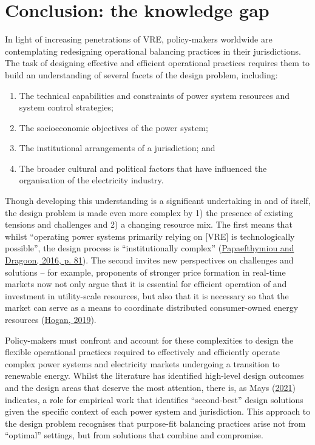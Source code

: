 \documentclass[12pt,a4paper,]{report}
\providecommand{\tightlist}{%
  \setlength{\itemsep}{0pt}\setlength{\parskip}{0pt}}
\begin{document}
\hypertarget{sec:lit_review-gap}{%
\section{Conclusion: the knowledge gap}\label{sec:lit_review-gap}}

In light of increasing penetrations of VRE, policy-makers worldwide are
contemplating redesigning operational balancing practices in their
jurisdictions. The task of designing effective and efficient operational
practices requires them to build an understanding of several facets of
the design problem, including:

\begin{enumerate}
\def\labelenumi{\arabic{enumi}.}
\tightlist
\item
  The technical capabilities and constraints of power system resources
  and system control strategies;
\item
  The socioeconomic objectives of the power system;
\item
  The institutional arrangements of a jurisdiction; and
\item
  The broader cultural and political factors that have influenced the
  organisation of the electricity industry.
\end{enumerate}

Though developing this understanding is a significant undertaking in and
of itself, the design problem is made even more complex by 1) the
presence of existing tensions and challenges and 2) a changing resource
mix. The first means that whilst ``operating power systems primarily
relying on {[}VRE{]} is technologically possible'', the design process
is ``institutionally complex''
(\protect\hyperlink{ref-papaefthymiou100RenewableEnergy2016}{Papaefthymiou
and Dragoon, 2016, p. 81}). The second invites new perspectives on
challenges and solutions -- for example, proponents of stronger price
formation in real-time markets now not only argue that it is essential
for efficient operation of and investment in utility-scale resources,
but also that it is necessary so that the market can serve as a means to
coordinate distributed consumer-owned energy resources
(\protect\hyperlink{ref-hoganMarketDesignPractices2019}{Hogan, 2019}).

Policy-makers must confront and account for these complexities to design
the flexible operational practices required to effectively and
efficiently operate complex power systems and electricity markets
undergoing a transition to renewable energy. Whilst the literature has
identified high-level design outcomes and the design areas that deserve
the most attention, there is, as Mays
(\protect\hyperlink{ref-maysMissingIncentivesFlexibility2021}{2021})
indicates, a role for empirical work that identifies ``second-best''
design solutions given the specific context of each power system and
jurisdiction. This approach to the design problem recognises that
purpose-fit balancing practices arise not from ``optimal'' settings, but
from solutions that combine and compromise.
\end{document}
